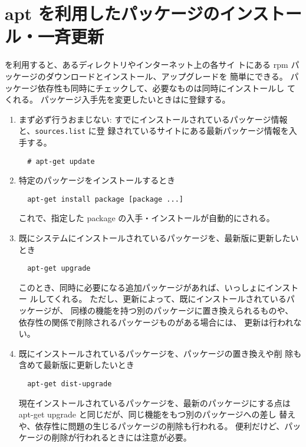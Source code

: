 \documentclass{jreport}
\begin{document}
\section{apt を利用したパッケージのインストール・一斉更新\label{sec:apt}}

 を利用すると、あるディレクトリやインターネット上の各サイ
トにある rpm パッケージのダウンロードとインストール、アップグレードを
簡単にできる。
パッケージ依存性も同時にチェックして、必要なものは同時にインストールし
てくれる。
パッケージ入手先を変更したいときはに登録する。
\begin{enumerate}
\item まず必ず行うおまじない: 
すでにインストールされているパッケージ情報と、\verb|sources.list| に登
録されているサイトにある最新パッケージ情報を入手する。
\begin{screen}
\begin{verbatim}
  # apt-get update 
\end{verbatim}
\end{screen}

\item  特定のパッケージをインストールするとき
\begin{screen}
\begin{verbatim}
  apt-get install package [package ...]
\end{verbatim}
\end{screen}

これで、指定した package の入手・インストールが自動的にされる。

\item  既にシステムにインストールされているパッケージを、最新版に更新したいとき
\begin{screen}
\begin{verbatim}
  apt-get upgrade
\end{verbatim}
\end{screen}

このとき、同時に必要になる追加パッケージがあれば、いっしょにインストー
ルしてくれる。
ただし、更新によって、既にインストールされているパッケージが、
同様の機能を持つ別のパッケージに置き換えられるものや、
依存性の関係で削除されるパッケージものがある場合には、
更新は行われない。

\item 既にインストールされているパッケージを、パッケージの置き換えや削
  除も含めて最新版に更新したいとき
\begin{screen}
\begin{verbatim}
  apt-get dist-upgrade
\end{verbatim}
\end{screen}
現在インストールされているパッケージを、最新のパッケージにする点は
apt-get upgrade と同じだが、同じ機能をもつ別のパッケージへの差し
替えや、依存性に問題の生じるパッケージの削除も行われる。
便利だけど、パッケージの削除が行われるときには注意が必要。
\end{enumerate}
\end{document}

